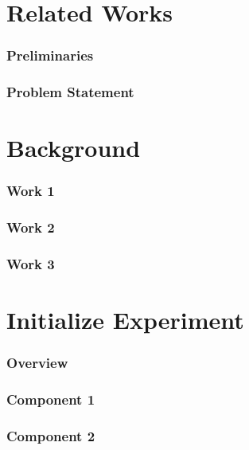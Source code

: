 \documentclass[aspectratio=169]{beamer}
\begin{document}
\section{Related Works}
\begin{frame}
\frametitle{Preliminaries}

\end{frame}

\begin{frame}
\frametitle{Problem Statement}

\end{frame}

\section{Background}
\begin{frame}
\frametitle{Work 1}

\end{frame}

\begin{frame}
\frametitle{Work 2}

\end{frame}

\begin{frame}
\frametitle{Work 3}

\end{frame}



\section{Initialize Experiment}

\begin{frame}
	\frametitle{Overview}
	
\end{frame}


\begin{frame}
	\frametitle{Component 1}
	
\end{frame}

\begin{frame}
	\frametitle{Component 2}
	
\end{frame}
\end{document}
